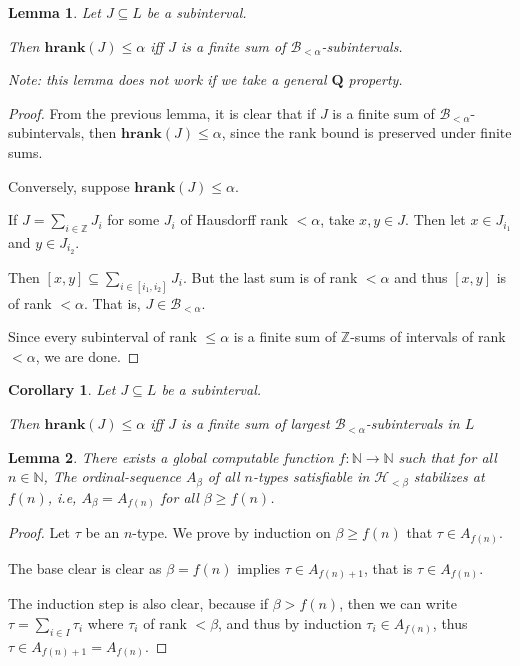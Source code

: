\documentclass{article}
\newtheorem{corollary}{Corollary}
\newtheorem{lemma}{Lemma}
\newcommand{\hrank}[1]{\mathbf{hrank}\left( #1 \right)}
\newcommand{\qq}{\mathbf{Q}}
\newcommand{\NN}{\mathbb{N}}
\newcommand{\ZZ}{\mathbb{Z}}
\begin{document}
\begin{lemma}
  Let $J \subseteq L$ be a subinterval.

  Then $\hrank{J} \le \alpha$ iff $J$ is a finite sum of $\mathcal{B}_{< \alpha}$-subintervals.

  Note: this lemma does not work if we take a general $\qq$ property.
\end{lemma}

\begin{proof}
  From the previous lemma, it is clear that if $J$ is a finite sum of $\mathcal{B}_{< \alpha}$-subintervals,
  then $\hrank{J} \le \alpha$, since the rank bound is preserved under finite sums.

  Conversely, suppose $\hrank{J} \le \alpha$.

  If $J = \sum_{i \in \ZZ} J_i$ for some $J_i$ of Hausdorff rank $< \alpha$,
  take $x, y \in J$. Then let $x \in J_{i_1}$ and $y \in J_{i_2}$.
  
  Then $[x, y] \subseteq \sum_{i \in [i_1, i_2]} J_i$. But the last sum is of rank $< \alpha$
  and thus $[x, y]$ is of rank $< \alpha$. That is, $J \in \mathcal{B}_{< \alpha}$.

  Since every subinterval of rank $\le \alpha$ is a finite sum of $\ZZ$-sums of intervals of rank $< \alpha$,
  we are done.
\end{proof}

\begin{corollary}
  Let $J \subseteq L$ be a subinterval.

  Then $\hrank{J} \le \alpha$ iff $J$ is a finite sum of largest $\mathcal{B}_{< \alpha}$-subintervals in $L$
\end{corollary}

\begin{lemma}
  There exists a global computable function $f : \NN \to \NN$ such that for all $n \in \NN$,
  The ordinal-sequence $A_\beta$ of all $n$-types satisfiable 
  in $\mathcal{H}_{< \beta}$ stabilizes at $f(n)$,
  i.e, $A_{\beta} = A_{f(n)}$ for all $\beta \ge f(n)$.
\end{lemma}

\begin{proof}
  Let $\tau$ be an $n$-type. We prove by induction
  on $\beta \ge f(n)$ that $\tau \in A_{f(n)}$.

  The base clear is clear as $\beta = f(n)$ implies $\tau \in A_{f(n)+1}$,
  that is $\tau \in A_{f(n)}$.

  The induction step is also clear, because if $\beta > f(n)$,
  then we can write $\tau = \sum_{i \in I} \tau_i$ where $\tau_i$
  of rank $< \beta$, and thus by induction $\tau_i \in A_{f(n)}$,
  thus $\tau \in A_{f(n)+1}=A_{f(n)}$.
\end{proof}
\end{document}
